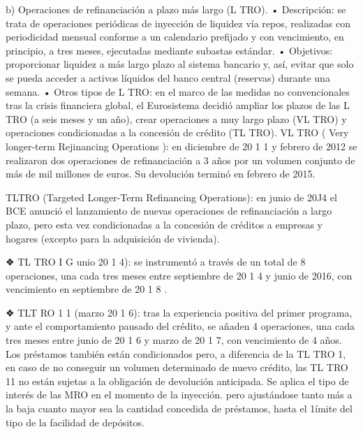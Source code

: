\documentclass[10pt,a4paper]{article}
\begin{document}
{b) Operaciones de refinanciación a plazo más largo (L TRO). 
• Descripción: se trata de operaciones periódicas de inyección de liquidez vía repos, realizadas con periodicidad mensual conforme a un calendario prefijado y con vencimiento, en principio, a tres meses, ejecutadas mediante subastas estándar. • Objetivos: proporcionar liquidez a más largo plazo al sistema bancario y, así, evitar que solo se pueda acceder a activos líquidos del banco central (reservas) durante una semana. • Otros tipos de L TRO: en el marco de las medidas no convencionales tras la crisis financiera global, el Eurosistema decidió ampliar los plazos de las L TRO (a seis meses y un año), crear operaciones a muy largo plazo (VL TRO) y operaciones condicionadas a la concesión de crédito (TL TRO). VL TRO ( Very longer-term Rejinancing Operations ): en diciembre de 20 1 1 y febrero de 2012 se realizaron dos operaciones de refinanciación a 3 años por un volumen conjunto de más de mil millones de euros. Su devolución terminó en febrero de 2015.

TLTRO (Targeted Longer-Term Refinancing Operations): en junio de 20J4 el BCE anunció el lanzamiento de nuevas operaciones de refinanciación a largo plazo, pero esta vez condicionadas a la concesión de créditos a empresas y hogares (excepto para la adquisición de vivienda). 

❖ TL TRO I G unio 20 1 4): se instrumentó a través de un total de 8 operaciones, una cada tres meses entre septiembre de 20 1 4 y junio de 2016, con vencimiento en septiembre de 20 1 8 .

❖ TLT RO 1 1 (marzo 20 1 6): tras la experiencia positiva del primer programa, y ante el comportamiento pausado del crédito, se añaden 4 operaciones, una cada tres meses entre junio de 20 1 6 y marzo de 20 1 7, con vencimiento de 4 años. Los préstamos también están condicionados pero, a diferencia de la TL TRO 1, en caso de no conseguir un volumen determinado de nuevo crédito, las TL TRO 11 no están sujetas a la obligación de devolución anticipada. Se aplica el tipo de interés de las MRO en el momento de la inyección. pero ajustándose tanto más a la baja cuanto mayor sea la cantidad concedida de préstamos, hasta el 1ímite del tipo de la facilidad de depósitos. 

}
\end{document}
